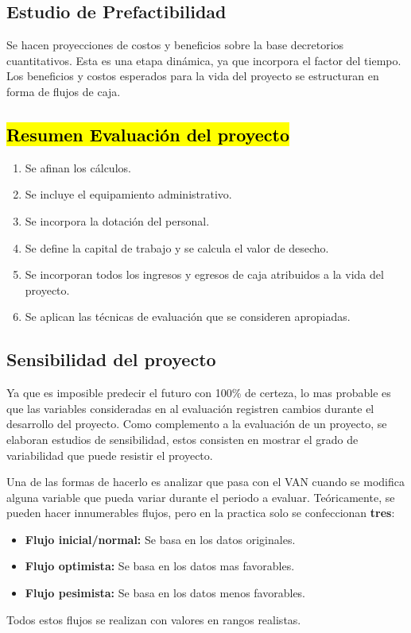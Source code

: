 \documentclass{templateNote}
\begin{document}
\subsection{Estudio de Prefactibilidad}

Se hacen proyecciones de costos y beneficios sobre la base decretorios cuantitativos. Esta es una etapa dinámica, ya que incorpora el factor del tiempo. Los beneficios y costos esperados para la vida del proyecto se estructuran en forma de flujos de caja.

\subsection{\hl{Resumen Evaluación del proyecto}}
\begin{enumerate}
    \item Se afinan los cálculos.
    \item Se incluye el equipamiento administrativo.
    \item Se incorpora la dotación del personal.
    \item Se define la capital de trabajo y se calcula el valor de desecho.
    \item Se incorporan todos los ingresos y egresos de caja atribuidos a la vida del proyecto.
    \item Se aplican las técnicas de evaluación que se consideren apropiadas.
\end{enumerate}

\subsection{Sensibilidad del proyecto}
Ya que es imposible predecir el futuro con 100\% de certeza, lo mas probable es que las variables consideradas en al evaluación registren cambios durante el desarrollo del proyecto.
Como complemento a la evaluación de un proyecto, se elaboran estudios de sensibilidad, estos consisten en mostrar el grado de variabilidad que puede resistir el proyecto.

Una de las formas de hacerlo es analizar que pasa con el VAN cuando se modifica alguna variable que pueda variar durante el periodo a evaluar. Teóricamente, se pueden hacer innumerables flujos, pero en la practica solo se confeccionan \textbf{tres}:
\begin{itemize}
    \item \textbf{Flujo inicial/normal:} Se basa en los datos originales.
    \item \textbf{Flujo optimista:} Se basa en los datos mas favorables.
    \item \textbf{Flujo pesimista:} Se basa en los datos menos favorables.
\end{itemize}
Todos estos flujos se realizan con valores en rangos realistas.
\end{document}
